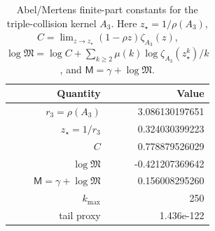 \begin{table}[H]
\centering
\scriptsize
\setlength{\tabcolsep}{6pt}
\caption{Abel/Mertens finite-part constants for the triple-collision kernel $A_3$. Here $z_\star=1/\rho(A_3)$, $C=\lim_{z\to z_\star}(1-\rho z)\zeta_{A_3}(z)$, $\log\mathfrak{M}=\log C+\sum_{k\ge2}\mu(k)\log\zeta_{A_3}(z_\star^k)/k$, and $\mathsf{M}=\gamma+\log\mathfrak{M}$.}
\label{tab:collision_kernel_A3_finite_part}
\begin{tabular}{r r}
\toprule
Quantity & Value\\
\midrule
$r_3=\rho(A_3)$ & 3.086130197651\\
$z_\star=1/r_3$ & 0.324030399223\\
$C$ & 0.778879526029\\
$\log\mathfrak{M}$ & -0.421207369642\\
$\mathsf{M}=\gamma+\log\mathfrak{M}$ & 0.156008295260\\
$k_{\max}$ & 250\\
tail proxy & 1.436e-122\\
\bottomrule
\end{tabular}
\end{table}
